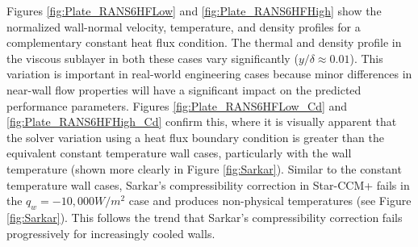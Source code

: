 \documentclass[journal ]{new-aiaa}
\begin{document}
Figures \ref{fig:Plate_RANS6HFLow} and \ref{fig:Plate_RANS6HFHigh} show the normalized wall-normal velocity, temperature, and density profiles for a complementary constant heat flux condition. The thermal and density profile in the viscous sublayer in both these cases vary significantly ($y/\delta \approx 0.01$). This variation is important in real-world engineering cases because minor differences in near-wall flow properties will have a significant impact on the predicted performance parameters. Figures \ref{fig:Plate_RANS6HFLow_Cd} and \ref{fig:Plate_RANS6HFHigh_Cd} confirm this, where it is visually apparent that the solver variation using a heat flux boundary condition is greater than the equivalent constant temperature wall cases, particularly with the wall temperature (shown more clearly in Figure \ref{fig:Sarkar}). Similar to the constant temperature wall cases, Sarkar's compressibility correction in Star-CCM+ fails in the $q_w = -10,000 W/m^2$ case and produces non-physical temperatures (see Figure \ref{fig:Sarkar}). This follows the trend that Sarkar's compressibility correction fails progressively for increasingly cooled walls. 
\end{document}
